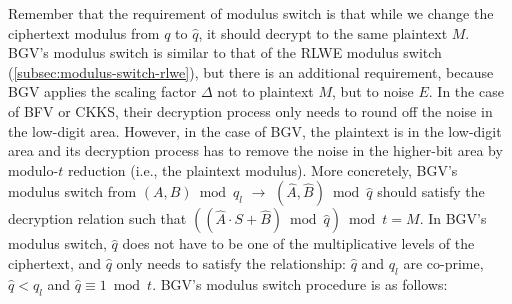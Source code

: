 Remember that the requirement of modulus switch is that while we change the ciphertext modulus from $q$ to $\hat q$, it should decrypt to the same plaintext $M$. BGV's modulus switch is similar to that of the RLWE modulus switch (\autoref{subsec:modulus-switch-rlwe}), but there is an additional requirement, because BGV applies the scaling factor $\Delta$ not to plaintext $M$, but to noise $E$. In the case of BFV or CKKS, their decryption process only needs to round off the noise in the low-digit area. However, in the case of BGV, the plaintext is in the low-digit area and its decryption process has to remove the noise in the higher-bit area by modulo-$t$ reduction (i.e., the plaintext modulus). More concretely, BGV's modulus switch from $(A, B) \bmod q_{l}$ $\rightarrow$  $(\hat{A}, \hat{B}) \bmod \hat{q}$ should satisfy the decryption relation such that $((\hat{A} \cdot S + \hat{B}) \bmod \hat{q}) \bmod t = M$. In BGV's modulus switch, $\hat{q}$ does not have to be one of the multiplicative levels of the ciphertext, and $\hat{q}$ only needs to satisfy the relationship: $\hat{q}$ and $q_l$ are co-prime, $\hat{q} < q_l$ and $\hat{q} \equiv 1 \bmod t$. BGV's modulus switch procedure is as follows:

$ $

